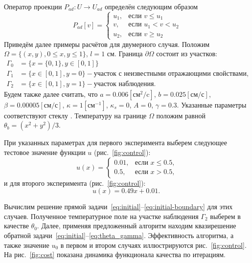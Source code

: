 Оператор проекции $P_{ad} : U \to U_{ad}$ определён следующим образом
\[
    P_{ad}[v] =
    \begin{cases}
        u_1, & \text{если } v \le u_1 \\
        v, & \text{если } u_1 < v < u_2 \\
        u_2, & \text{если } v \ge u_2
    \end{cases}
\]
Приведём далее примеры расчётов для двумерного случая.
Положим $\Omega = \{(x,y), 0 \leq x,y \leq 1\}$, $l = 1$ см.
Граница $\partial\Omega$ состоит из участков:
\[
    \begin{aligned}
        \Gamma_0 & = \{x=\{0,1\}, y \in [0,1]\} \\
        \Gamma_1 & = \{x\in [0,1], y=0\} - \text{участок с неизвестными отражающими свойствами,} \\
        \Gamma_2 & = \{x \in [0,1], y=1\} - \text{участок наблюдения.}
    \end{aligned}
\]
Будем также далее считать, что $a = 0.006[\text{см}^2/\text{c}]$, $b=0.025[\text{см}/\text{с}]$,
$\beta = 0.00005[\text{см}/\text{с}]$, $\kappa=1[\text{см}^{-1}]$, $\kappa_s = 0$, $A = 0$, $\gamma = 0.3$.
Указанные параметры соответствуют стеклу \cite{grenkin_13}.
Температуру на границе $\Omega$ положим равной $\theta_b = (x^2+y^2)/3$.

При указанных параметрах для первого эксперимента выберем следующее тестовое значение
функции $u$ (рис.~\ref{fig:control}):
\begin{equation}
    u(x)=
    \begin{cases}
        0.01, & \text{если } x \le 0.5, \\
        0.5, & \text{если } x > 0.5,
    \end{cases}\label{eq:equation}
\end{equation}
и для второго эксперимента (рис.~\ref{fig:control}):
\begin{equation}
    \label{eq:test_function_1}
    u(x)=0.49x+0.01. \;
\end{equation}

Вычислим решение прямой задачи~\eqref{eq:initial}--\eqref{eq:initial-boundary} для этих случаев.
Полученное температурное поле на участке наблюдения $\Gamma_2$ выберем в качестве $\theta_0$.
Далее, применяя предложенный алгоритм находим квазирешение
обратной задачи~\eqref{eq:initial}--\eqref{eq:theta_gamma}.
Эффективность алгоритма, а также значение $u_0$ в первом и
втором случаях иллюстрируются рис.~\ref{fig:control}.
На рис.~\ref{fig:cost} показана динамика функционала качества по итерациям.

